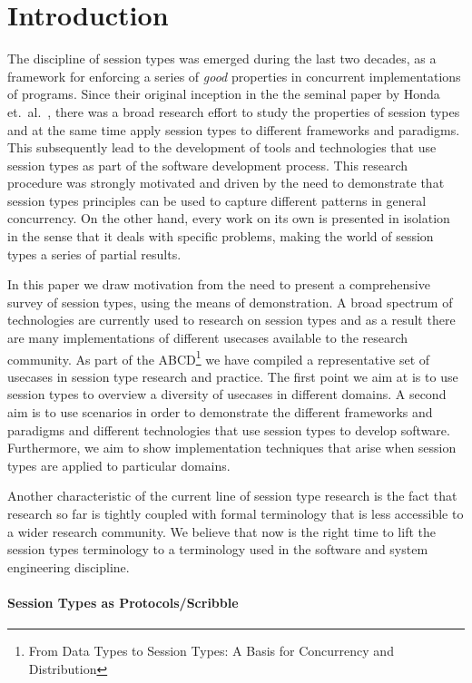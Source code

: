 \section{Introduction}

The discipline of session types was emerged during the last
two decades, as a framework for enforcing a series of
{\em good} properties in concurrent implementations of programs.
Since their original inception in the
the seminal paper by Honda et.~al.~\cite{Honda.Vasconcelos.Kubo},
there was a broad research effort to study the properties of
session types and at the same time apply session types to different
frameworks and paradigms. This subsequently lead to the development
of tools and technologies that use session types as part of the 
software development process.
This research procedure was strongly motivated and driven by the
need to demonstrate that session types principles can be used
to capture different patterns in general concurrency.
On the other hand, every work on its own is presented in isolation
in the sense that it deals with specific problems, making the world
of session types a series of partial results.

In this paper we draw motivation from the need to present a comprehensive
survey of session types, using the means of demonstration. A broad spectrum
of technologies are currently used to research on session types and as
a result there are many implementations of different usecases available
to the research community.
As part of the ABCD\footnote{From Data Types to Session Types: A Basis for Concurrency and Distribution}
we have compiled a representative set of usecases in session type research
and practice.
The first point we aim at is to use session types to overview a diversity
of usecases in different domains.
A second aim is to use scenarios in order to demonstrate the different
frameworks and paradigms and different technologies that use
session types to develop software. Furthermore, we aim to show implementation
techniques that arise when session types are applied to particular domains.

Another characteristic of the current line of session type research is
the fact that research so far is tightly coupled with formal terminology
that is less accessible to a wider research community. We believe that
now is the right time to lift the session types terminology to a terminology
used in the software and system engineering discipline.

\paragraph{Session Types as Protocols/Scribble}

